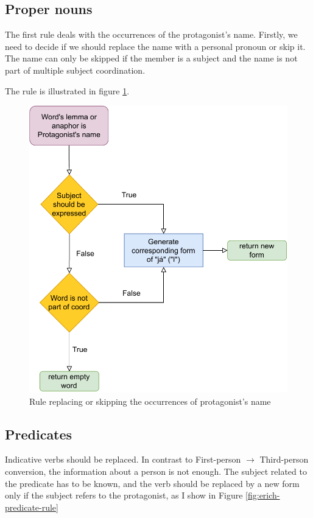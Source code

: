 \subsection{Proper nouns}

The first rule deals with the occurrences of the protagonist's name. Firstly, we need to decide if we should replace the name with a personal pronoun or skip it. The name can only be skipped if the member is a subject and the name is not part of multiple subject coordination.

The rule is illustrated in figure \ref{fig:erich-name-rule}.

\begin{figure}[!htbp]
\includegraphics[width=\textwidth]{data/Erich-Name-Rule.pdf}
\caption{Rule replacing or skipping the occurrences of protagonist's name}
\label{fig:erich-name-rule}
\end{figure}

\subsection{Predicates}

Indicative verbs should be replaced. In contrast to First-person $\rightarrow$ Third-person conversion, the information about a person is not enough. The subject related to the predicate has to be known, and the verb should be replaced by a new form only if the subject refers to the protagonist, as I show in Figure \ref{fig:erich-predicate-rule}

